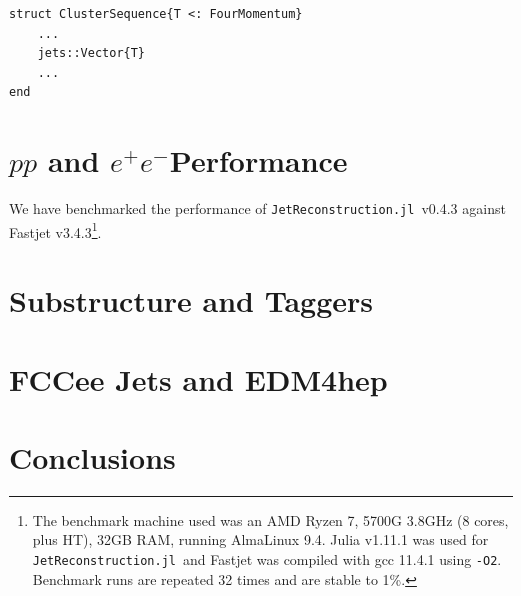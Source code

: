 \documentclass{webofc}
\newcommand{\JR}{\texttt{JetReconstruction.jl}}
\newcommand{\ee}{$e^+e^-$}
\begin{document}
\begin{verbatim}
struct ClusterSequence{T <: FourMomentum}
    ...
    jets::Vector{T}
    ...
end
\end{verbatim}

\section{$pp$ and \ee Performance}
\label{sec:performance}

We have benchmarked the performance of \JR\ v0.4.3 against Fastjet v3.4.3\footnote{The benchmark machine used was an AMD Ryzen 7, 5700G 3.8GHz (8 cores, plus HT), 32GB RAM, running AlmaLinux 9.4. Julia v1.11.1 was used for \JR\ and Fastjet was compiled with gcc 11.4.1 using \texttt{-O2}. Benchmark runs are repeated 32 times and are stable to 1\%.}.



\section{Substructure and Taggers}
\label{sec:sstag}

\section{FCCee Jets and EDM4hep}
\label{sec:fccee}

\section{Conclusions}
\label{sec:conclusions}

\sloppy
\raggedright

\end{document}
